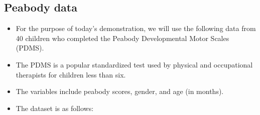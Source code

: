 \documentclass[
]{book}
\begin{document}
\subsection{Peabody data}\label{peabody-data}

\begin{itemize}
\item
  For the purpose of today's demonstration, we will use the following data from 40 children who completed the Peabody Developmental Motor Scales (PDMS).
\item
  The PDMS is a popular standardized test used by physical and occupational therapists for children less than six.
\item
  The variables include peabody scores, gender, and age (in months).
\item
  The dataset is as follows:
\end{itemize}
\end{document}
